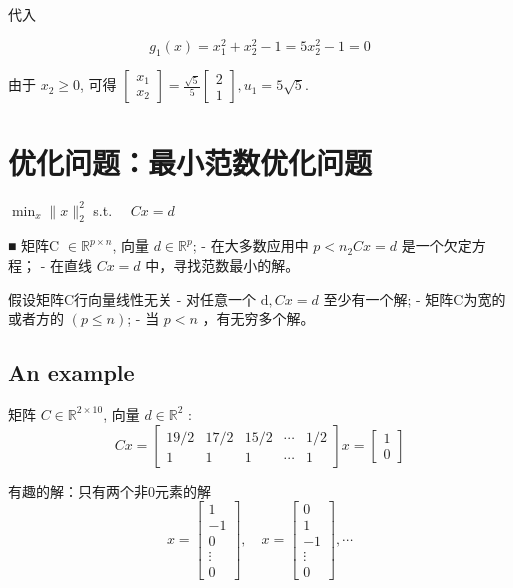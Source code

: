 代入

$$g_{1}(x)=x_{1}^{2}+x_{2}^{2}-1=5 x_{2}^{2}-1=0$$


由于 $ x_{2} \geq 0 $, 可得 $ \left[\begin{array}{l}x_{1} \\ x_{2}\end{array}\right]=\frac{\sqrt{5}}{5}\left[\begin{array}{l}2 \\ 1\end{array}\right], u_{1}=5 \sqrt{5} $.

\section{优化问题：最小范数优化问题}

\begin{problem}
    $ \min _{x}\|x\|_{2}^{2} $
s.t. $ \quad C x=d $
\end{problem}

■ 矩阵C $ \in \mathbb{R}^{p \times n} $, 向量 $ d \in \mathbb{R}^{p} $;
- 在大多数应用中 $ p<n_{2} C x=d $ 是一个欠定方程；
- 在直线 $ C x=d $ 中，寻找范数最小的解。

假设矩阵C行向量线性无关
- 对任意一个 $ \mathrm{d}, C x=d $ 至少有一个解;
- 矩阵C为宽的或者方的 $ (p \leq n) $;
- 当 $ p<n $ ，有无穷多个解。

\subsection{An example}

矩阵 $ C \in \mathbb{R}^{2 \times 10} $, 向量 $ d \in \mathbb{R}^{2} $ :
$$
C x=\left[\begin{array}{ccccc}
19 / 2 & 17 / 2 & 15 / 2 & \cdots & 1 / 2 \\
1 & 1 & 1 & \cdots & 1
\end{array}\right] x=\left[\begin{array}{l}
1 \\
0
\end{array}\right]
$$

有趣的解：只有两个非0元素的解
$$
x=\left[\begin{array}{c}
1 \\
-1 \\
0 \\
\vdots \\
0
\end{array}\right], \quad x=\left[\begin{array}{c}
0 \\
1 \\
-1 \\
\vdots \\
0
\end{array}\right], \cdots
$$

